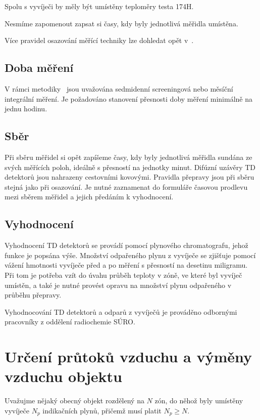 Spolu s vyvíječi by měly být umístěny teploměry testa 174H.

Nesmíme zapomenout zapsat si časy, kdy byly jednotlivá měřidla umístěna.

Více pravidel osazování měřící techniky lze dohledat opět v~\cite{metodika}.

\subsection{Doba měření}
V rámci metodiky~\cite{metodika} jsou uvažována sedmidenní screeningová nebo měsíční integrální měření. Je požadováno stanovení přesnosti doby měření minimálně na jednu hodinu. 

\subsection{Sběr}
Při sběru měřidel si opět zapíšeme časy, kdy byly jednotlivá měřidla sundána ze svých měřících poloh, ideálně s přesností na jednotky minut. Difúzní uzávěry TD detektorů jsou nahrazeny cestovními kovovými. Pravidla přepravy jsou při sběru stejná jako při osazování. Je nutné zaznamenat do formuláře časovou prodlevu mezi sběrem měřidel a jejich předáním k vyhodnocení.

\subsection{Vyhodnocení}
Vyhodnocení TD detektorů se provádí pomocí plynového chromatografu, jehož funkce je popsána výše. Množství odpařeného plynu z vyvíječe se zjišťuje pomocí vážení hmotnosti vyvíječe před a po měření s přesností na desetinu miligramu. Při tom je potřeba vzít do úvahu průběh teploty v zóně, ve které byl vyvíječ umístěn, a také je nutné provést opravu na množství plynu odpařeného v průběhu přepravy.

Vyhodnocování TD detektorů a odparů z vyvíječů je prováděno odbornými pracovníky z oddělení radiochemie SÚRO.

\section{Určení průtoků vzduchu a výměny vzduchu objektu}
Uvažujme nějaký obecný objekt rozdělený na $N$ zón, do něhož byly umístěny vyvíječe $N_p$ indikačních plynů, přičemž musí platit $N_p\geq N$.

